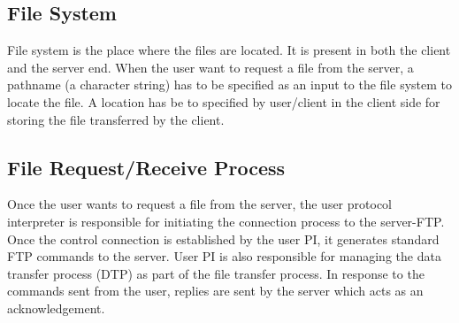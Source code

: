 \documentclass[9pt,twocolumn,twoside]{styles/osajnl}
\begin{document}
\subsection{File System}
File system is the place where the files are located. It is present in both the client and the server end. When the user want to request a file from the server, a pathname (a character string) has to be specified as an input to the file system to locate the file. A location has be to specified by user/client in the client side for storing the file transferred by the client. 

\subsection{File Request/Receive Process}
Once the user wants to request a file from the server, the user protocol interpreter is responsible for initiating the connection process to the server-FTP. Once the control connection is established by the user PI, it generates standard FTP commands to the server. User PI is also responsible for managing the data transfer process (DTP) as part of the file transfer process. In response to the commands sent from the user, replies are sent by the server which acts as an acknowledgement.\\
\end{document}
